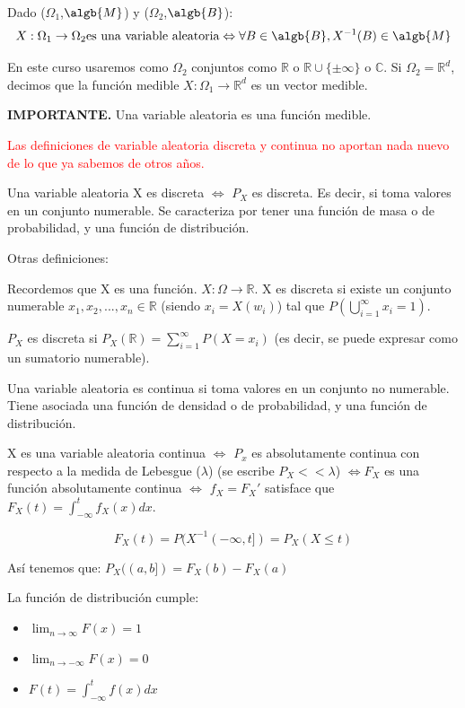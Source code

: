 \documentclass{apuntes}
\begin{document}
\begin{defn} 
Dado ($\Omega_1$,$\algb{M}$) y ($\Omega_2$,$\algb{B}$):
\[
X: \Omega_1 \rightarrow \Omega_2 \text{es una variable aleatoria} \Leftrightarrow \forall B \in \algb{B}, X^{-1}(B) \in \algb{M}
\]

En este curso usaremos como $\Omega_2$ conjuntos como $\mathbb{R}$ o $\mathbb{R} \cup \{\pm \infty\}$ o $\mathbb{C}$. Si $\Omega_2 = \mathbb{R}^d$, decimos que la función medible $X: \Omega_1 \rightarrow \mathbb{R}^d$ es un vector medible.
\end{defn}
\obs \textbf{IMPORTANTE. }Una variable aleatoria es una función medible.

\textcolor{red}{Las definiciones de variable aleatoria discreta y continua no aportan nada nuevo de lo que ya sabemos de otros años.}

\begin{defn}
Una variable aleatoria X es discreta $\Leftrightarrow$ $P_X$ es discreta. Es decir, si toma valores en un conjunto numerable. Se caracteriza por tener una función de masa o de probabilidad, y una función de distribución.

Otras definiciones:

Recordemos que X es una función. $X: \Omega \rightarrow \mathbb{R}$. X es discreta si existe un conjunto numerable $x_1, x_2,...,x_n \in \mathbb{R}$ (siendo $x_i=X(w_i)$) tal que $P(\bigcup_{i=1}^{\infty}x_i=1)$.

$P_X$ es discreta si $P_X(\mathbb{R})=\sum_{i=1}^{\infty}P(X=x_i)$ (es decir, se puede expresar como un sumatorio numerable).
\end{defn}

\begin{defn}
Una variable aleatoria es continua si toma valores en un conjunto no numerable. Tiene asociada una función de densidad o de probabilidad, y una función de distribución.

X es una variable aleatoria continua $\Leftrightarrow$ $P_x$ es absolutamente continua con respecto a la medida de Lebesgue ($\lambda$) (se escribe $P_X << \lambda$) $\Leftrightarrow F_X$ es una función absolutamente continua $\Leftrightarrow$ $f_X=F_X'$ satisface que $F_X(t)=\int_{-\infty}^{t}f_X(x)dx$.
\end{defn}

\begin{defn}
\[
F_X(t)=P(X^{-1}(-\infty,t])=P_X(X \leq t)
\]

Así tenemos que: $P_X((a,b])=F_X(b)-F_X(a)$

La función de distribución cumple:
\begin{itemize}
\item $\lim_{n \rightarrow \infty}F(x)=1$
\item $\lim_{n \rightarrow -\infty}F(x)=0$
\item $F(t)=\int_{-\infty}^{t}f(x)dx$
\end{itemize}

\end{defn}
\end{document}
